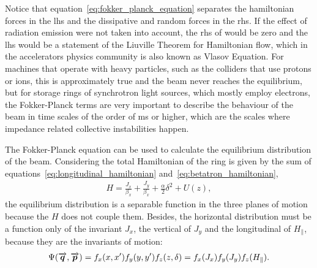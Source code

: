     Notice that equation~\eqref{eq:fokker_planck_equation} separates the hamiltonian forces in the \gls{lhs} and the dissipative and random forces in the \gls{rhs}. If the effect of radiation emission were not taken into account, the \gls{rhs} of would be zero and the \gls{lhs} would be a statement of the Liuville Theorem for Hamiltonian flow, which in the accelerators physics community is also known as Vlasov Equation. For machines that operate with heavy particles, such as the colliders that use protons or ions, this is approximately true and the beam never reaches the equilibrium, but for storage rings of synchrotron light sources, which mostly employ electrons, the Fokker-Planck terms are very important to describe the behaviour of the beam in time scales of the order of \si{\milli\second} or higher, which are the scales where impedance related collective instabilities happen.

    The Fokker-Planck equation can be used to calculate the equilibrium distribution of the beam. Considering the total Hamiltonian of the ring is given by the sum of equations~\eqref{eq:longitudinal_hamiltonian} and~\eqref{eq:betatron_hamiltonian},
    \begin{align}
        H = \frac{J_x}{\beta_x} + \frac{J_y}{\beta_x} + \frac\alpha2\delta^2 + U(z),
    \end{align}
    the equilibrium distribution is a separable function in the three planes of motion because the $H$ does not couple them. Besides, the horizontal distribution must be a function only of the invariant $J_x$, the vertical of $J_y$ and the longitudinal of $H_\parallel$, because they are the invariants of motion:
    \begin{align}
        \Psi(\overrightarrow{\boldsymbol{q}},\overrightarrow{\boldsymbol{p}}) =
        f_x(x,x')f_y(y,y')f_z(z,\delta) =
        f_x(J_x)f_y(J_y)f_z(H_\parallel).
    \end{align}

